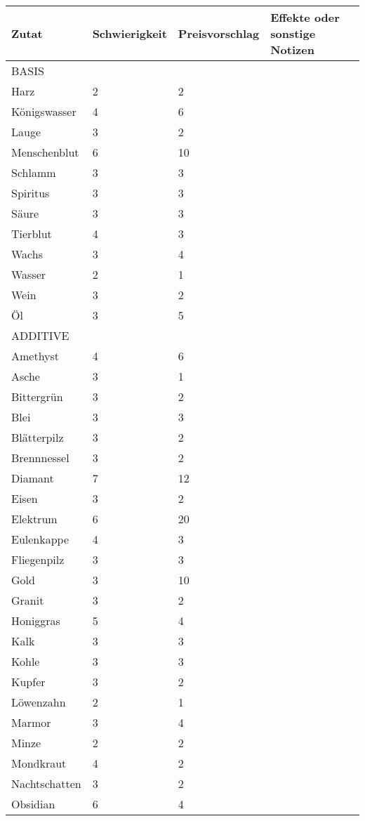 \documentclass{article}
\begin{document}
\begin{small}
\begin{tabular}{|m{3cm}|m{3cm}|m{4cm}|m{6cm}|}
\hline
\textbf{Zutat}&\textbf{Schwierigkeit}&\textbf{Preisvorschlag}&\textbf{Effekte oder sonstige Notizen}\\
\hline
\hline
BASIS&&&\\
\hline
Harz&2&2&\\
\hline
Königswasser&4&6&\\
\hline
Lauge&3&2&\\
\hline
Menschenblut&6&10&\\
\hline
Schlamm&3&3&\\
\hline
Spiritus&3&3&\\
\hline
Säure&3&3&\\
\hline
Tierblut&4&3&\\
\hline
Wachs&3&4&\\
\hline
Wasser&2&1&\\
\hline
Wein&3&2&\\
\hline
Öl&3&5&\\
\hline
ADDITIVE&&&\\
\hline
Amethyst&4&6&\\
\hline
Asche&3&1&\\
\hline
Bittergrün&3&2&\\
\hline
Blei&3&3&\\
\hline
Blätterpilz&3&2&\\
\hline
Brennnessel&3&2&\\
\hline
Diamant&7&12&\\
\hline
Eisen&3&2&\\
\hline
Elektrum&6&20&\\
\hline
Eulenkappe&4&3&\\
\hline
Fliegenpilz&3&3&\\
\hline
Gold&3&10&\\
\hline
Granit&3&2&\\
\hline
Honiggras&5&4&\\
\hline
Kalk&3&3&\\
\hline
Kohle&3&3&\\
\hline
Kupfer&3&2&\\
\hline
Löwenzahn&2&1&\\
\hline
Marmor&3&4&\\
\hline
Minze&2&2&\\
\hline
Mondkraut&4&2&\\
\hline
Nachtschatten&3&2&\\
\hline
Obsidian&6&4&\\
\hline

\end{tabular}
\end{small}
\end{document}
